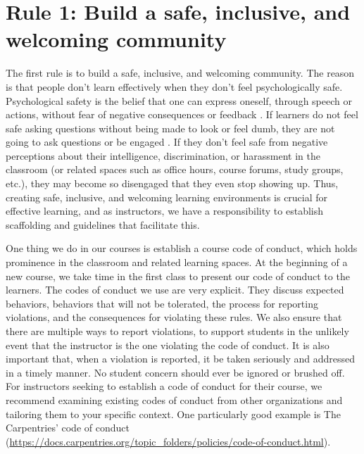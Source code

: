 \documentclass[
  10pt,
  letterpaper,
]{article}
\begin{document}
\section{Rule 1: Build a safe, inclusive, and welcoming
community}\label{sec-rule1}

The first rule is to build a safe, inclusive, and welcoming community.
The reason is that people don't learn effectively when they don't feel
psychologically safe. Psychological safety is the belief that one can
express oneself, through speech or actions, without fear of negative
consequences or feedback \citep{edmondson1999psychological}. If learners
do not feel safe asking questions without being made to look or feel
dumb, they are not going to ask questions or be engaged
\citep{lyman2021pre}. If they don't feel safe from negative perceptions
about their intelligence, discrimination, or harassment in the classroom
(or related spaces such as office hours, course forums, study groups,
etc.), they may become so disengaged that they even stop showing up.
Thus, creating safe, inclusive, and welcoming learning environments is
crucial for effective learning, and as instructors, we have a
responsibility to establish scaffolding and guidelines that facilitate
this.

One thing we do in our courses is establish a course code of conduct,
which holds prominence in the classroom and related learning spaces. At
the beginning of a new course, we take time in the first class to
present our code of conduct to the learners. The codes of conduct we use
are very explicit. They discuss expected behaviors, behaviors that will
not be tolerated, the process for reporting violations, and the
consequences for violating these rules. We also ensure that there are
multiple ways to report violations, to support students in the unlikely
event that the instructor is the one violating the code of conduct. It
is also important that, when a violation is reported, it be taken
seriously and addressed in a timely manner. No student concern should
ever be ignored or brushed off. For instructors seeking to establish a
code of conduct for their course, we recommend examining existing codes
of conduct from other organizations and tailoring them to your specific
context. One particularly good example is The Carpentries' code of
conduct
(\url{https://docs.carpentries.org/topic_folders/policies/code-of-conduct.html}).
\end{document}
